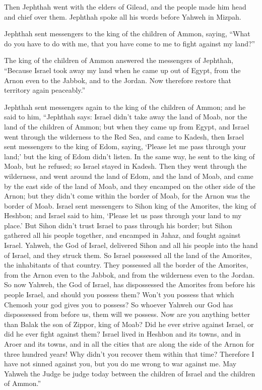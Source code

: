  Then Jephthah went with the elders of Gilead, and the
people made him head and chief over them. Jephthah spoke all his words
before Yahweh in Mizpah.

 Jephthah sent messengers to the king of the children of
Ammon, saying, ``What do you have to do with me, that you have come to
me to fight against my land?''

 The king of the children of Ammon answered the
messengers of Jephthah, ``Because Israel took away my land when he came
up out of Egypt, from the Arnon even to the Jabbok, and to the Jordan.
Now therefore restore that territory again peaceably.''

 Jephthah sent messengers again to the king of the
children of Ammon;  and he said to him, ``Jephthah says:
Israel didn't take away the land of Moab, nor the land of the children
of Ammon;  but when they came up from Egypt, and Israel
went through the wilderness to the Red Sea, and came to Kadesh,
 then Israel sent messengers to the king of Edom, saying,
`Please let me pass through your land;' but the king of Edom didn't
listen. In the same way, he sent to the king of Moab, but he refused; so
Israel stayed in Kadesh.  Then they went through the
wilderness, and went around the land of Edom, and the land of Moab, and
came by the east side of the land of Moab, and they encamped on the
other side of the Arnon; but they didn't come within the border of Moab,
for the Arnon was the border of Moab.  Israel sent
messengers to Sihon king of the Amorites, the king of Heshbon; and
Israel said to him, `Please let us pass through your land to my place.'
 But Sihon didn't trust Israel to pass through his
border; but Sihon gathered all his people together, and encamped in
Jahaz, and fought against Israel.  Yahweh, the God of
Israel, delivered Sihon and all his people into the hand of Israel, and
they struck them. So Israel possessed all the land of the Amorites, the
inhabitants of that country.  They possessed all the
border of the Amorites, from the Arnon even to the Jabbok, and from the
wilderness even to the Jordan.  So now Yahweh, the God of
Israel, has dispossessed the Amorites from before his people Israel, and
should you possess them?  Won't you possess that which
Chemosh your god gives you to possess? So whoever Yahweh our God has
dispossessed from before us, them will we possess.  Now
are you anything better than Balak the son of Zippor, king of Moab? Did
he ever strive against Israel, or did he ever fight against them?
 Israel lived in Heshbon and its towns, and in Aroer and
its towns, and in all the cities that are along the side of the Arnon
for three hundred years! Why didn't you recover them within that time?
 Therefore I have not sinned against you, but you do me
wrong to war against me. May Yahweh the Judge be judge today between the
children of Israel and the children of Ammon.''

